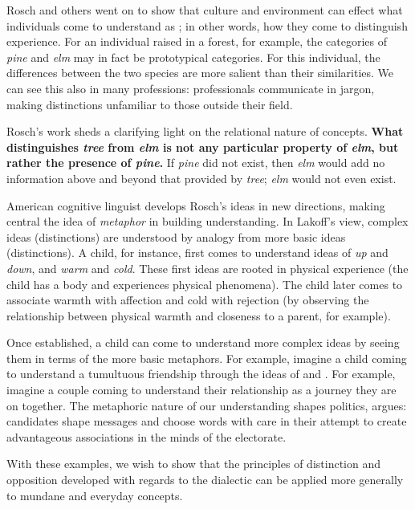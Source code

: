 Rosch and others went on to show that culture and environment can effect what individuals come to understand as ; in other words, how they come to distinguish experience.
For an individual raised in a forest, for example, the categories of \textit{pine} and \textit{elm} may in fact be prototypical categories.
For this individual, the differences between the two species are more salient than their similarities.
We can see this also in many professions: professionals communicate in jargon, making distinctions unfamiliar to those outside their field.

Rosch's work sheds a clarifying light on the relational nature of concepts.
\textbf{What distinguishes \textit{tree} from \textit{elm} is not any particular property of \textit{elm}, but rather the presence of \textit{pine}.}
If \textit{pine} did not exist, then \textit{elm} would add no information above and beyond that provided by \textit{tree}; \textit{elm} would not even exist.

American cognitive linguist \citet{lakoff03} develops Rosch's ideas in new directions, making central the idea of \textit{metaphor} in building understanding.
In Lakoff's view, complex ideas (distinctions) are understood by analogy from more basic ideas (distinctions).
A child, for instance, first comes to understand ideas of \textit{up} and \textit{down}, and \textit{warm} and \textit{cold}.
These first ideas are rooted in physical experience (the child has a body and experiences physical phenomena).
The child later comes to associate warmth with affection and cold with rejection (by observing the relationship between physical warmth and closeness to a parent, for example).

Once established, a child can come to understand more complex ideas by seeing them in terms of the more basic metaphors.
For example, imagine a child coming to understand a tumultuous friendship through the ideas of  and .
For example, imagine a couple coming to understand their relationship as a journey they are on together.
The metaphoric nature of our understanding shapes politics, \citet{lakoff14} argues: candidates shape messages and choose words with care in their attempt to create advantageous associations in the minds of the electorate.

With these examples, we wish to show that the principles of distinction and opposition developed with regards to the dialectic can be applied more generally to mundane and everyday concepts.

